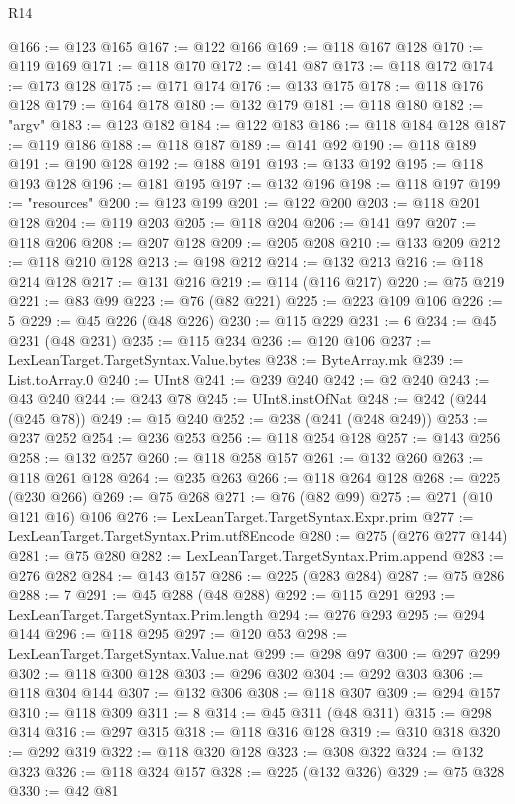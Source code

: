 \begin{lexlean}{R14}
\begin{coremodule}
{{{{{{{{{{{{{{{{{{{{{{{{{{{{{{{{{{{{{{{{{{{{{{{{{{{{{{{{{{{{{{{{{{{{{{{{{{{{{{{{{{@166 := @123 @165
@167 := @122 @166
@169 := @118 @167 @128
@170 := @119 @169
@171 := @118 @170
@172 := @141 @87
@173 := @118 @172
@174 := @173 @128
@175 := @171 @174
@176 := @133 @175
@178 := @118 @176 @128
@179 := @164 @178
@180 := @132 @179
@181 := @118 @180
@182 := "argv"
@183 := @123 @182
@184 := @122 @183
@186 := @118 @184 @128
@187 := @119 @186
@188 := @118 @187
@189 := @141 @92
@190 := @118 @189
@191 := @190 @128
@192 := @188 @191
@193 := @133 @192
@195 := @118 @193 @128
@196 := @181 @195
@197 := @132 @196
@198 := @118 @197
@199 := "resources"
@200 := @123 @199
@201 := @122 @200
@203 := @118 @201 @128
@204 := @119 @203
@205 := @118 @204
@206 := @141 @97
@207 := @118 @206
@208 := @207 @128
@209 := @205 @208
@210 := @133 @209
@212 := @118 @210 @128
@213 := @198 @212
@214 := @132 @213
@216 := @118 @214 @128
@217 := @131 @216
@219 := @114 (@116 @217)
@220 := @75 @219
@221 := @83 @99
@223 := @76 (@82 @221)
@225 := @223 @109 @106
@226 := 5
@229 := @45 @226 (@48 @226)
@230 := @115 @229
@231 := 6
@234 := @45 @231 (@48 @231)
@235 := @115 @234
@236 := @120 @106
@237 := LexLeanTarget.TargetSyntax.Value.bytes
@238 := ByteArray.mk
@239 := List.toArray.{0}
@240 := UInt8
@241 := @239 @240
@242 := @2 @240
@243 := @43 @240
@244 := @243 @78
@245 := UInt8.instOfNat
@248 := @242 (@244 (@245 @78))
@249 := @15 @240
@252 := @238 (@241 (@248 @249))
@253 := @237 @252
@254 := @236 @253
@256 := @118 @254 @128
@257 := @143 @256
@258 := @132 @257
@260 := @118 @258 @157
@261 := @132 @260
@263 := @118 @261 @128
@264 := @235 @263
@266 := @118 @264 @128
@268 := @225 (@230 @266)
@269 := @75 @268
@271 := @76 (@82 @99)
@275 := @271 (@10 @121 @16) @106
@276 := LexLeanTarget.TargetSyntax.Expr.prim
@277 := LexLeanTarget.TargetSyntax.Prim.utf8Encode
@280 := @275 (@276 @277 @144)
@281 := @75 @280
@282 := LexLeanTarget.TargetSyntax.Prim.append
@283 := @276 @282
@284 := @143 @157
@286 := @225 (@283 @284)
@287 := @75 @286
@288 := 7
@291 := @45 @288 (@48 @288)
@292 := @115 @291
@293 := LexLeanTarget.TargetSyntax.Prim.length
@294 := @276 @293
@295 := @294 @144
@296 := @118 @295
@297 := @120 @53
@298 := LexLeanTarget.TargetSyntax.Value.nat
@299 := @298 @97
@300 := @297 @299
@302 := @118 @300 @128
@303 := @296 @302
@304 := @292 @303
@306 := @118 @304 @144
@307 := @132 @306
@308 := @118 @307
@309 := @294 @157
@310 := @118 @309
@311 := 8
@314 := @45 @311 (@48 @311)
@315 := @298 @314
@316 := @297 @315
@318 := @118 @316 @128
@319 := @310 @318
@320 := @292 @319
@322 := @118 @320 @128
@323 := @308 @322
@324 := @132 @323
@326 := @118 @324 @157
@328 := @225 (@132 @326)
@329 := @75 @328
@330 := @42 @81
}}}}}}}}}}}}}}}}}}}}}}}}}}}}}}}}}}}}}}}}}}}}}}}}}}}}}}}}}}}}}}}}}}}}}}}}}}}}}}}}}}
\end{coremodule}
\end{lexlean}
